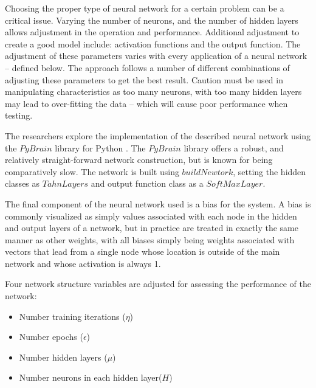 \documentclass[conference]{IEEEtran}
\begin{document}
{Choosing the proper type of neural network for a certain problem can be a critical issue.
Varying the number of neurons, and the number of hidden layers allows adjustment in the operation and performance.
Additional adjustment to create a good model include: activation functions and the output function\cite{moustafa}. 
The adjustment of these parameters varies with every application of a neural network -- defined below.
The approach follows a number of different combinations of adjusting these parameters to get the best result.
Caution must be used in manipulating characteristics as too many neurons, with too many hidden layers may lead to over-fitting the data -- which will cause poor performance when testing.

The researchers explore the implementation of the described neural network using the $PyBrain$ library for Python \cite{PyBrain}.
The $PyBrain$ library offers a robust, and relatively straight-forward network construction, but is known for being comparatively slow.
The network is built using $buildNewtork$, setting the hidden classes as $TahnLayers$ and output function class as a $SoftMaxLayer$.

The final component of the neural network used is a bias for the system.
A bias is commonly visualized as simply values associated with each node in the hidden and output layers of a network, but in practice are treated in exactly the same manner as other weights, with all biases simply being weights associated with vectors that lead from a single node whose location is outside of the main network and whose activation is always 1.

Four network structure variables are adjusted for assessing the performance of the network:
\begin{itemize}
\item Number training iterations ($\eta$)
\item Number epochs ($\epsilon$)
\item Number hidden layers ($\mu$)
\item Number neurons in each hidden layer($H$)
\end{itemize}

}
\end{document}
